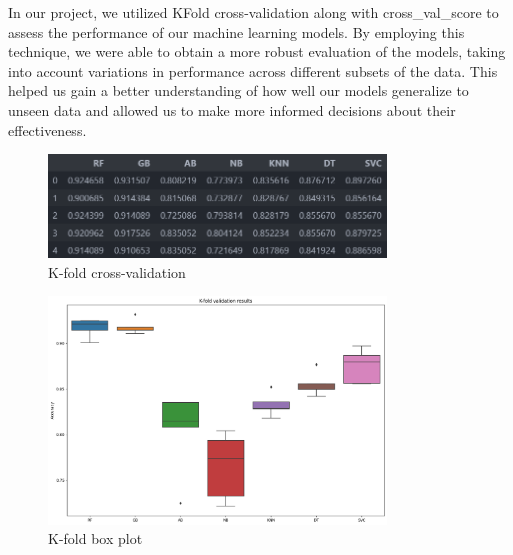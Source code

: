 In our project, we utilized KFold cross-validation along with cross\_val\_score to assess the performance of our machine learning models. By employing this technique, we were able to obtain a more robust evaluation of the models, taking into account variations in performance across different subsets of the data. This helped us gain a better understanding of how well our models generalize to unseen data and allowed us to make more informed decisions about their effectiveness.

\begin{figure}[h!]
    \centering
    \includegraphics[width=0.8\textwidth]{imgs/kfold_1.png}
    \caption{K-fold cross-validation}
    \label{fig:K-fold cross-validation}
\end{figure}

\begin{figure}[h!]
    \centering
    \includegraphics[width=0.8\textwidth]{imgs/kfold_box.png}
    \caption{K-fold box plot}
    \label{fig:K-fold box}
\end{figure}

